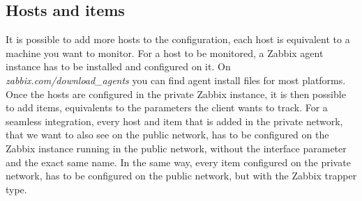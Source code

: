 \documentclass[a4paper,11pt]{scrartcl}
\begin{document}
\subsection{Hosts and items}
It is possible to add more hosts to the configuration, each host is equivalent to a machine you want to monitor. For a host to be monitored, a Zabbix agent instance has to be installed and configured on it. On \textit{zabbix.com/download\_agents} you can find agent install files for most platforms. Once the hosts are configured in the private Zabbix instance, it is then possible to add items, equivalents to the parameters the client wants to track. For a seamless integration, every host and item that is added in the private network, that we want to also see on the public network, has to be configured on the Zabbix instance running in the public network, without the interface parameter and the exact same name. In the same way, every item configured on the private network, has to be configured on the public network, but with the Zabbix trapper type.
\end{document}
